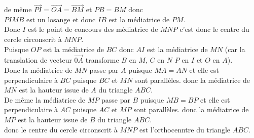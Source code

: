 \documentclass[a4paper,11pt]{book}
\begin{document}
de m\^eme  $\overrightarrow{PI}= \overrightarrow{OA}= \overrightarrow{BM}$ et
$PB=BM$ donc \\
 $PIMB$ est un losange et donc $IB$ est la m\'ediatrice de $PM$.\\
Donc $I$ est le point de concours des m\'ediatrice de $MNP$ c'est donc le 
centre du cercle circonscrit \`a $MNP$.\\
Puisque $OP$ est la m\'ediatrice de $BC$ donc $AI$ est la m\'ediatrice de 
$MN$ (car la translation de vecteur $\overrightarrow{0A}$ transforme $B$ en $M$, $C$ en $N$ $P$ en $I$ et $O$ en $A$).\\
Donc la m\'ediatrice de $MN$ passe par $A$ puisque $MA=AN$ et elle est 
perpendiculaire \`a $BC$ puisque $BC$ et $MN$ sont parall\`eles. donc la 
m\'ediatrice de $MN$ est la hauteur issue de $A$ du triangle $ABC$.\\
De m\^eme la m\'ediatrice de $MP$ passe par $B$ puisque $MB=BP$ et elle est 
perpendiculaire \`a $AC$ puisque $AC$ et $MP$ sont parall\`eles. donc la 
m\'ediatrice de $MP$ est la hauteur issue de $B$ du triangle $ABC$.\\
donc le centre du cercle circonscrit \`a $MNP$ est l'orthocenntre du triangle 
$ABC$.\\
\end{document}
